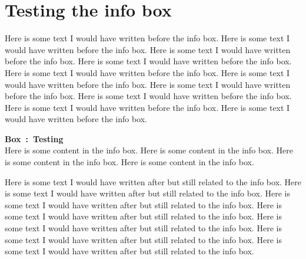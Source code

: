\documentclass[12pt]{scrartcl}
\newcounter{fobox}[subsection] %
\newenvironment{infobox}[3]{
	\refstepcounter{fobox}\par
	\wrapfigure{#2}{#3}
		\boxedminipage{#3}
			\textbf{Box~\thefobox:\ #1}~\\ \noindent}
		{\endboxedminipage
	\endwrapfigure}
\begin{document}
\section{Testing the info box}

Here is some text I would have written before the info box. Here is some text I would have written before the info box. Here is some text I would have written before the info box. Here is some text I would have written before the info box. Here is some text I would have written before the info box. Here is some text I would have written before the info box. Here is some text I would have written before the info box. Here is some text I would have written before the info box. Here is some text I would have written before the info box. Here is some text I would have written before the info box.


\begin{infobox}{Testing}{R}{0.5\textwidth}
	Here is some content in the info box. Here is some content in the info box. Here is some content in the info box. Here is some content in the info box. 
\end{infobox}

Here is some text I would have written after but still related to the info box. Here is some text I would have written after but still related to the info box. Here is some text I would have written after but still related to the info box. Here is some text I would have written after but still related to the info box. Here is some text I would have written after but still related to the info box. Here is some text I would have written after but still related to the info box. Here is some text I would have written after but still related to the info box.
\end{document}
